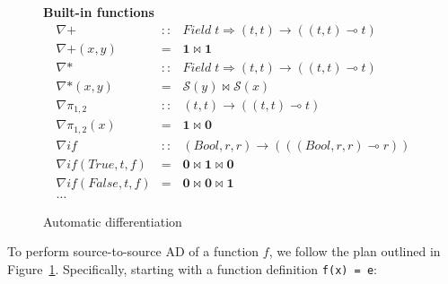 \documentclass[sigplan,review]{acmart}
\renewcommand{\to}{\rightarrow}    %
\newcommand{\linto}{\multimap}     %
\newcommand{\gradf}[1]{\nabla\! \mathit{#1}}  %
\newcommand{\sel}[2]{\pi_{#1,#2}}
\newcommand{\iffun}{\mathit{if}}
\newcommand{\darrow}{\Rightarrow}    %
\newcommand{\lmjoin}{\bowtie}        %
\newcommand{\lmzero}{\mathbf{0}}     %
\newcommand{\lmone}{\mathbf{1}}      %
\newcommand{\lmscalar}[1]{{\mathcal S}(#1)}      %
\begin{document}
\begin{figure}
{\begin{minipage}{\columnwidth}
$$      $$
      \vspace{2mm}
      \bf{Built-in functions}
      $$
      \begin{array}{rcl}
        \gradf{+}      & :: & Field\; t \darrow (t,t) \to ((t,t) \linto t) \\
        \gradf{+}(x,y) & = & \lmone \lmjoin \lmone \\[1mm]
        \gradf{*}      & :: & Field\; t \darrow (t,t) \to ((t,t) \linto t) \\
        \gradf{*}(x,y) & = & \lmscalar{y} \lmjoin \lmscalar{x} \\[1mm]
        \gradf{\sel{1}{2}}      & :: & (t,t) \to ((t,t) \linto t) \\
        \gradf{\sel{1}{2}}(x) & = & \lmone \lmjoin \lmzero \\[1mm]
        \gradf{\iffun} & :: & (Bool,r,r) \to (((Bool,r,r) \linto r)) \\
        \gradf{\iffun}(True,t,f) & = & \lmzero \lmjoin \lmone \lmjoin \lmzero \\
        \gradf{\iffun}(False,t,f) & = & \lmzero \lmjoin \lmzero \lmjoin \lmone \\
        \ldots
        \end{array}
$$
\end{minipage}}
\caption{Automatic differentiation} \label{fig:ad}
\end{figure}

To perform source-to-source AD of a function $f$, we follow the plan
outlined in Figure~\ref{fig:ad}.  Specifically, starting with a
function definition \lstinline|f(x) = e|:
\end{document}
